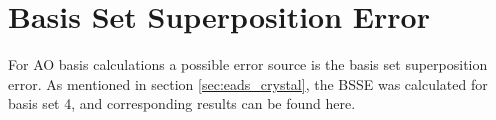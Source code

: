 \documentclass[11pt,DIV=13,BCOR=5mm,a4paper,headinclude]{scrbook}
\begin{document}

\appendix

\captionsetup{labelformat=myformat}
\def\thefigure{A.\arabic{figure}}
\def\thetable{A.\arabic{table}}
\section{Basis Set Superposition Error}\label{app:BSSE}
For AO basis calculations a possible error source is the basis set superposition error.
As mentioned in section \ref{sec:eads_crystal}, the BSSE was calculated for basis set 4, and corresponding results can be found here.
\end{document}
